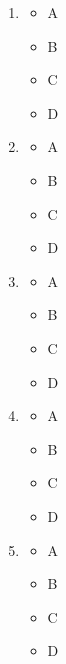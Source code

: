 \documentclass[11pt]{article}
\begin{document}
\begin{enumerate}
\begin{multicols}{4}
    \begin{itemize}[label=$\Box$]
      \item A
      \item B
      \item C
      \item D
    \end{itemize}
    \end{multicols}
  \item \begin{multicols}{4}
    \begin{itemize}[label=$\Box$]
      \item A
      \item B
      \item C
      \item D
    \end{itemize}
    \end{multicols}
  \item \begin{multicols}{4}
    \begin{itemize}[label=$\Box$]
      \item A
      \item B
      \item C
      \item D
    \end{itemize}
    \end{multicols}
  \item \begin{multicols}{4}
    \begin{itemize}[label=$\Box$]
      \item A
      \item B
      \item C
      \item D
    \end{itemize}
    \end{multicols}
  \item \begin{multicols}{4}
    \begin{itemize}[label=$\Box$]
      \item A
      \item B
      \item C
      \item D
    \end{itemize}
    \end{multicols}
  \item \begin{multicols}{4}
    \begin{itemize}[label=$\Box$]
      \item A
      \item B
      \item C
      \item D
    \end{itemize}
    \end{multicols}
\end{enumerate}
\end{document}
